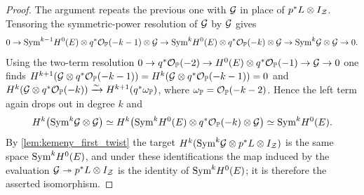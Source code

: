\begin{proof}
  The argument repeats the previous one with \(\mathcal{G}\) in place of
  \(p^*L\otimes I_{\mathcal{Z}}\).  Tensoring the symmetric-power resolution of \(\mathcal{G}\) by
  \(\mathcal{G}\) gives
  \[
    0\to\mathrm{Sym}^{k-1}H^0(E)\otimes q^*\mathcal{O}_{\mathbb{P}}(-k-1)\otimes\mathcal{G}
      \to\mathrm{Sym}^kH^0(E)\otimes q^*\mathcal{O}_{\mathbb{P}}(-k)\otimes\mathcal{G}
      \to\mathrm{Sym}^k\mathcal{G}\otimes\mathcal{G}\to0 .
  \]
  Using the two-term resolution
  \(0\to q^*\mathcal{O}_{\mathbb{P}}(-2)\to H^0(E)\otimes q^*\mathcal{O}_{\mathbb{P}}(-1)\to\mathcal{G}\to0\) one finds
  \(H^{k+1}(\mathcal{G}\otimes q^*\mathcal{O}_{\mathbb{P}}(-k-1))=H^k(\mathcal{G}\otimes q^*\mathcal{O}_{\mathbb{P}}(-k-1))=0\)
  and \(H^k(\mathcal{G}\otimes q^*\mathcal{O}_{\mathbb{P}}(-k))\xrightarrow{\sim}H^{k+1}(q^*\omega_{\mathbb{P}})\),
  where \(\omega_{\mathbb{P}}=\mathcal{O}_{\mathbb{P}}(-k-2)\).  Hence the left term again drops out in
  degree \(k\) and
  \[
    H^k\bigl(\mathrm{Sym}^k\mathcal{G}\otimes\mathcal{G}\bigr)\simeq
    H^k\bigl(\mathrm{Sym}^kH^0(E)\otimes q^*\mathcal{O}_{\mathbb{P}}(-k)\otimes\mathcal{G}\bigr)\simeq\mathrm{Sym}^kH^0(E).
  \]
  By \cref{lem:kemeny_first_twist} the target
  \(H^k(\mathrm{Sym}^k\mathcal{G}\otimes p^*L\otimes I_{\mathcal{Z}})\) is the same space
  \(\mathrm{Sym}^kH^0(E)\), and under these identifications the map induced by the
  evaluation \(\mathcal{G}\twoheadrightarrow p^*L\otimes I_{\mathcal{Z}}\) is the identity of
  \(\mathrm{Sym}^kH^0(E)\); it is therefore the asserted isomorphism.
\end{proof}

